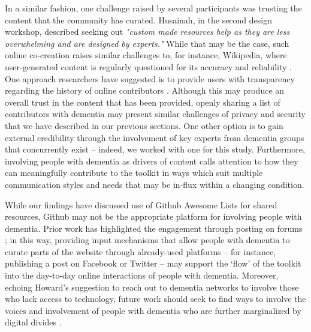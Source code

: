 In a similar fashion, one challenge raised by several participants was trusting the content that the community has curated. Husainah, in the second design workshop, described seeking out \textit{"custom made resources help as they are less overwhelming and are designed by experts."} While that may be the case, such online co-creation raises similar challenges to, for instance, Wikipedia, where user-generated content is regularly questioned for its accuracy and reliability  \citep{kittur2008can}. One approach researchers have suggested is to provide users with transparency regarding the history of online contributors \citep{heuer2018trust}. Although this may produce an overall trust in the content that has been provided, openly sharing a list of contributors with dementia may present similar challenges of privacy and security that we have described in our previous sections. One other option is to gain external credibility through the involvement of key experts from dementia groups that concurrently exist – indeed, we worked with one for this study. Furthermore, involving people with dementia as drivers of content calls attention to how they can meaningfully contribute to the toolkit in ways which suit multiple communication styles and needs that may be in-flux within a changing condition.

While our findings have discussed use of Github Awesome Lists for shared resources, Github may not be the appropriate platform for involving people with dementia. Prior work has highlighted the engagement through posting on forums \citep{johnson_older_2019,lazar_supporting_2017}; in this way, providing input mechanisms that allow people with dementia to curate parts of the website through already-used platforms – for instance, publishing a post on Facebook or Twitter \citep{talbot_how_2020} – may support the ‘flow’ of the toolkit into the day-to-day online interactions of people with dementia. Moreover, echoing Howard’s suggestion to reach out to dementia networks to involve those who lack access to technology, future work should seek to find ways to involve the voices and involvement of people with dementia who are further marginalized by digital divides \citep{harrington_forgotten_2020}.

